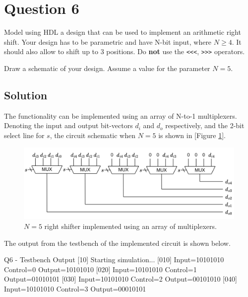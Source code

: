 \documentclass[../main.tex]{subfiles}
\begin{document}
\section{Question 6}

Model using HDL a design that can be used to implement an arithmetic right shift. Your design has to be parametric and have N-bit input, where $N \geq 4$. It should also allow to shift up to 3 positions. Do \textbf{not} use the \texttt{<<<}, \texttt{>>>} operators.

Draw a schematic of your design. Assume a value for the parameter $N = 5$.

\subsection*{Solution}

The functionality can be implemented using an array of N-to-1 multiplexers. Denoting the input and output bit-vectors $d_i$ and $d_o$ respectively, and the 2-bit select line for $s$, the circuit schematic when $N = 5$ is shown in [Figure \ref{q6}].

\begin{figure}[h]
    \centering
    \includegraphics[width=1.0\linewidth]{assets/q6.png}
    \caption{$N = 5$ right shifter implemented using an array of multiplexers.}
    \label{q6}
\end{figure}

The output from the testbench of the implemented circuit is shown below.

\begin{mintedterminal}{Q6 - Testbench Output}
[10] Starting simulation...
[010] Input=10101010 Control=0 Output=10101010
[020] Input=10101010 Control=1 Output=01010101
[030] Input=10101010 Control=2 Output=00101010
[040] Input=10101010 Control=3 Output=00010101
\end{mintedterminal}
\end{document}
